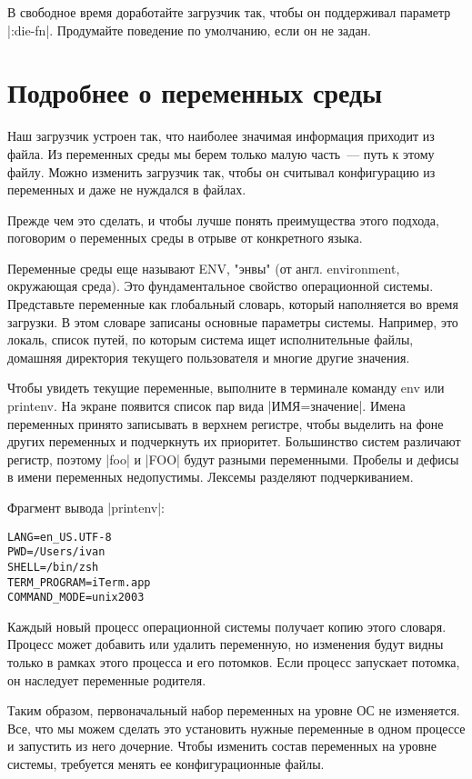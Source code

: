 В свободное время доработайте загрузчик так, чтобы он поддерживал параметр
\spverb|:die-fn|. Продумайте поведение по умолчанию, если он не задан.

\section{Подробнее о переменных среды}

Наш загрузчик устроен так, что наиболее значимая информация приходит из
файла. Из переменных среды мы берем только малую часть~--- путь к этому
файлу. Можно изменить загрузчик так, чтобы он считывал конфигурацию из
переменных и даже не нуждался в файлах.

Прежде чем это сделать, и чтобы лучше понять преимущества этого подхода,
поговорим о переменных среды в отрыве от конкретного языка.

Переменные среды еще называют ENV, "энвы" (от англ. environment, окружающая
среда). Это фундаментальное свойство операционной системы. Представьте
переменные как глобальный словарь, который наполняется во время загрузки. В этом
словаре записаны основные параметры системы. Например, это локаль, список путей,
по которым система ищет исполнительные файлы, домашняя директория текущего
пользователя и многие другие значения.

Чтобы увидеть текущие переменные, выполните в терминале команду env или
printenv. На экране появится список пар вида \spverb|ИМЯ=значение|. Имена переменных
принято записывать в верхнем регистре, чтобы выделить на фоне других переменных
и подчеркнуть их приоритет. Большинство систем различают регистр, поэтому \spverb|foo|
и \spverb|FOO| будут разными переменными. Пробелы и дефисы в имени переменных
недопустимы. Лексемы разделяют подчеркиванием.

Фрагмент вывода \spverb|printenv|:

\begin{verbatim}
LANG=en_US.UTF-8
PWD=/Users/ivan
SHELL=/bin/zsh
TERM_PROGRAM=iTerm.app
COMMAND_MODE=unix2003
\end{verbatim}

Каждый новый процесс операционной системы получает копию этого словаря. Процесс
может добавить или удалить переменную, но изменения будут видны только в рамках
этого процесса и его потомков. Если процесс запускает потомка, он наследует
переменные родителя.

Таким образом, первоначальный набор переменных на уровне ОС не изменяется. Все,
что мы можем сделать это установить нужные переменные в одном процессе и
запустить из него дочерние. Чтобы изменить состав переменных на уровне системы,
требуется менять ее конфигурационные файлы.

